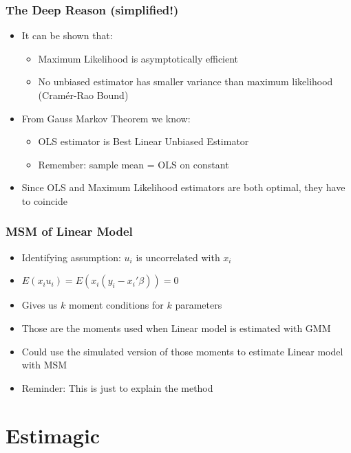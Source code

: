 \documentclass[11pt]{beamer}
\begin{document}
\begin{frame}[c]\frametitle{The Deep Reason (simplified!)}
\begin{itemize}
    \item It can be shown that:
    \begin{itemize}
        \item Maximum Likelihood is asymptotically efficient
        \item No unbiased estimator has smaller variance than maximum likelihood (Cramér-Rao Bound)
    \end{itemize}
    \item From Gauss Markov Theorem we know:
    \begin{itemize}
        \item OLS estimator is Best Linear Unbiased Estimator
        \item Remember: sample mean = OLS on constant
    \end{itemize}
    \item Since OLS and Maximum Likelihood estimators are both optimal, they have to coincide
\end{itemize}
\end{frame}


\begin{frame}[c]\frametitle{MSM of Linear Model}
    \begin{itemize}
        \item Identifying assumption: $u_i$ is uncorrelated with $x_i$
        \item $E(x_i u_i) = E(x_i (y_i - x_i' \beta)) = 0$
        \item Gives us $k$ moment conditions for $k$ parameters
        \item Those are the moments used when Linear model is estimated with GMM
        \item Could use the simulated version of those moments to estimate Linear model with MSM
        \item Reminder: This is just to explain the method
    \end{itemize}
\end{frame}






\section{Estimagic}
\end{document}
